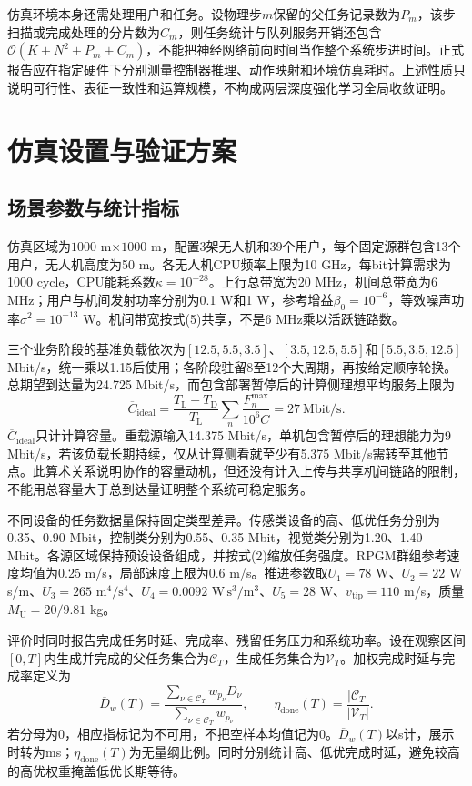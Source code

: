 仿真环境本身还需处理用户和任务。设物理步$m$保留的父任务记录数为$P_m$，该步扫描或完成处理的分片数为$C_m$，则任务统计与队列服务开销还包含$\mathcal O(K+N^2+P_m+C_m)$，不能把神经网络前向时间当作整个系统步进时间。正式报告应在指定硬件下分别测量控制器推理、动作映射和环境仿真耗时。上述性质只说明可行性、表征一致性和运算规模，不构成两层深度强化学习全局收敛证明。


\section{仿真设置与验证方案}
\subsection{场景参数与统计指标}
仿真区域为$1000$ m$\times1000$ m，配置3架无人机和39个用户，每个固定源群包含13个用户，无人机高度为50 m。各无人机CPU频率上限为10 GHz，每bit计算需求为1000 cycle，CPU能耗系数$\kappa=10^{-28}$。上行总带宽为20 MHz，机间总带宽为6 MHz；用户与机间发射功率分别为0.1 W和1 W，参考增益$\beta_0=10^{-6}$，等效噪声功率$\sigma^2=10^{-13}$ W。机间带宽按式(5)共享，不是6 MHz乘以活跃链路数。

三个业务阶段的基准负载依次为$[12.5,5.5,3.5]$、$[3.5,12.5,5.5]$和$[5.5,3.5,12.5]$ Mbit/s，统一乘以1.15后使用；各阶段驻留8至12个大周期，再按给定顺序轮换。总期望到达量为24.725 Mbit/s，而包含部署暂停后的计算侧理想平均服务上限为
\[
\overline C_{\mathrm{ideal}}
 =\frac{T_{\mathrm L}-T_{\mathrm D}}{T_{\mathrm L}}
 \sum_n\frac{F_n^{\max}}{10^6C}
 =27\ \mathrm{Mbit/s}.\tag{53}
\]
$\overline C_{\mathrm{ideal}}$只计计算容量。重载源输入14.375 Mbit/s，单机包含暂停后的理想能力为9 Mbit/s，若该负载长期持续，仅从计算侧看就至少有5.375 Mbit/s需转至其他节点。此算术关系说明协作的容量动机，但还没有计入上传与共享机间链路的限制，不能用总容量大于总到达量证明整个系统可稳定服务。

不同设备的任务数据量保持固定类型差异。传感类设备的高、低优任务分别为0.35、0.90 Mbit，控制类分别为0.55、0.35 Mbit，视觉类分别为1.20、1.40 Mbit。各源区域保持预设设备组成，并按式(2)缩放任务强度。RPGM群组参考速度均值为0.25 m/s，局部速度上限为0.6 m/s。推进参数取$U_1=78$ W、$U_2=22$ W\,s/m、$U_3=265$ $\mathrm{m^4/s^4}$、$U_4=0.0092$ $\mathrm{W\,s^3/m^3}$、$U_5=28$ W、$v_{\mathrm{tip}}=110$ m/s，质量$M_{\mathrm U}=20/9.81$ kg。

评价时同时报告完成任务时延、完成率、残留任务压力和系统功率。设在观察区间$[0,T]$内生成并完成的父任务集合为$\mathcal C_T$，生成任务集合为$\mathcal V_T$。加权完成时延与完成率定义为
\[
\overline D_w(T)=
 \frac{\sum_{\nu\in\mathcal C_T}w_{p_\nu}D_\nu}
 {\sum_{\nu\in\mathcal C_T}w_{p_\nu}},
 \qquad
 \eta_{\mathrm{done}}(T)=\frac{|\mathcal C_T|}{|\mathcal V_T|}.\tag{54}
\]
若分母为0，相应指标记为不可用，不把空样本均值记为0。$\overline D_w(T)$以s计，展示时转为ms；$\eta_{\mathrm{done}}(T)$为无量纲比例。同时分别统计高、低优完成时延，避免较高的高优权重掩盖低优长期等待。

